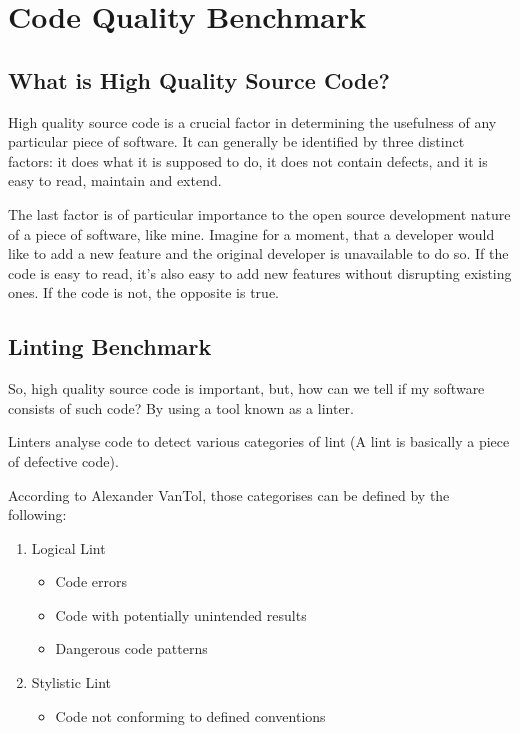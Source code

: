 \section{Code Quality Benchmark}
\subsection{What is High Quality Source Code?}
High quality source code is a crucial factor in determining the usefulness of any particular piece of software. It can generally be identified by three distinct factors: it does what it is supposed to do, it does not contain defects, and it is easy to read, maintain and extend\cite{code_quality}. 

The last factor is of particular importance to the open source development nature of a piece of software, like mine. Imagine for a moment, that a developer would like to add a new feature and the original developer is unavailable to do so. If the code is easy to read, it’s also easy to add new features without disrupting existing ones. If the code is not, the opposite is true. 

\subsection{Linting Benchmark}
So, high quality source code is important, but, how can we tell if my software consists of such code? By using a tool known as a linter. 

\begin{definition}
Linters analyse code to detect various categories of lint (A lint is basically a piece of defective code).
\end{definition}

According to Alexander VanTol\cite{code_quality}, those categorises can be defined by the following:

\begin{enumerate}
    \item Logical Lint
    \begin{itemize}
        \item Code errors
        \item Code with potentially unintended results
        \item Dangerous code patterns
    \end{itemize}
    \item Stylistic Lint
    \begin{itemize}
        \item Code not conforming to defined conventions
    \end{itemize}
\end{enumerate}

